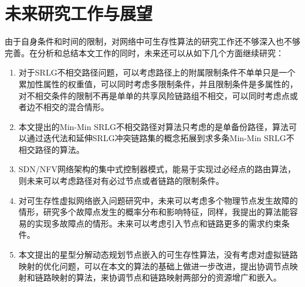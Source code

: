 \section{未来研究工作与展望}
由于自身条件和时间的限制，对网络中可生存性算法的研究工作还不够深入也不够完善。在分析和总结本文工作的同时，未来还可以从如下几个方面继续研究：
\begin{enumerate}
  \item 对于SRLG不相交路径问题，可以考虑路径上的附属限制条件不单单只是一个累加性属性的权重值，可以同时考虑多限制条件，并且限制条件是多属性的\cite{linchuang2011}，对不相交条件的限制不再是单单的共享风险链路组不相交，可以同时考虑点或者边不相交的混合情形。
  \item 本文提出的Min-Min SRLG不相交路径对算法只考虑的是单备份路径，算法可以通过迭代法和延伸SRLG冲突链路集的概念拓展到求多条Min-Min SRLG不相交路径的算法。
  \item SDN/NFV网络架构的集中式控制器模式，能易于实现过必经点的路由算法，则未来可以考虑路径对有必过节点或者链路的限制条件。
  \item 对可生存性虚拟网络嵌入问题研究中，未来可以考虑多个物理节点发生故障的情形，研究多个故障点发生的概率分布和影响特征，同样，我提出的算法能容易的实现多故障点的情形。未来可以考虑引入节点和链路更多的需求约束条件。
  \item 本文提出的星型分解动态规划节点嵌入的可生存性算法，没有考虑对虚拟链路映射的优化问题，可以在本文的算法的基础上做进一步改进，提出协调节点映射和链路映射的算法，来协调节点和链路映射两部分的资源增广和嵌入。
\end{enumerate}

